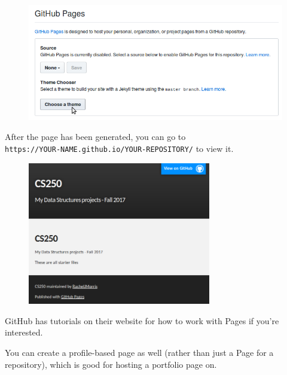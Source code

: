 \documentclass[a4paper,12pt,oneside]{book}
\begin{document}
        \begin{figure}[h]
            \centering
            \includegraphics[width=14cm]{images/github-pages.png}
        \end{figure}

        After the page has been generated, you can go to \\
            \texttt{https://YOUR-NAME.github.io/YOUR-REPOSITORY/}
        to view it.

        \begin{figure}[h]
            \centering
            \includegraphics[width=8cm]{images/github-pages3.png}
        \end{figure}

        GitHub has tutorials on their website for how to work with Pages
        if you're interested.

        You can create a profile-based page as well (rather than just a
        Page for a repository), which is good for hosting a portfolio page on.

        
\end{document}
